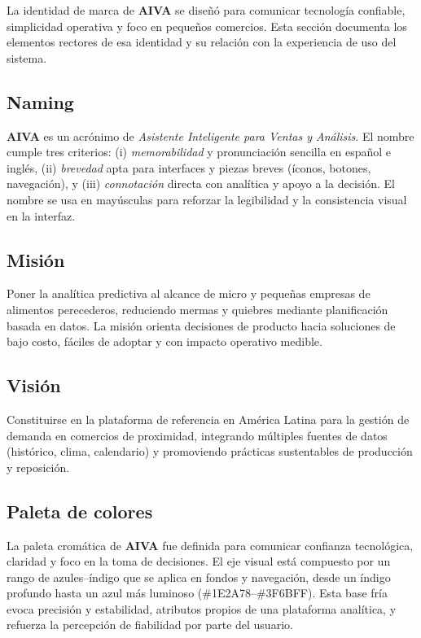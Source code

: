 La identidad de marca de \textbf{AIVA} se diseñó para comunicar tecnología confiable, simplicidad operativa y foco en pequeños comercios. Esta sección documenta los elementos rectores de esa identidad y su relación con la experiencia de uso del sistema.

\subsection{Naming}
\textbf{AIVA} es un acrónimo de \textit{Asistente Inteligente para Ventas y Análisis}. El nombre cumple tres criterios: (i) \textit{memorabilidad} y pronunciación sencilla en español e inglés, (ii) \textit{brevedad} apta para interfaces y piezas breves (íconos, botones, navegación), y (iii) \textit{connotación} directa con analítica y apoyo a la decisión. El nombre se usa en mayúsculas para reforzar la legibilidad y la consistencia visual en la interfaz.

\subsection{Misión}
Poner la analítica predictiva al alcance de micro y pequeñas empresas de alimentos perecederos, reduciendo mermas y quiebres mediante planificación basada en datos. La misión orienta decisiones de producto hacia soluciones de bajo costo, fáciles de adoptar y con impacto operativo medible.

\subsection{Visión}
Constituirse en la plataforma de referencia en América Latina para la gestión de demanda en comercios de proximidad, integrando múltiples fuentes de datos (histórico, clima, calendario) y promoviendo prácticas sustentables de producción y reposición.

\subsection{Paleta de colores}\label{subsec:paleta}

La paleta cromática de \textbf{AIVA} fue definida para comunicar confianza tecnológica, claridad y foco en la toma de decisiones. El eje visual está compuesto por un rango de azules–índigo que se aplica en fondos y navegación, desde un índigo profundo hasta un azul más luminoso (\#1E2A78–\#3F6BFF). Esta base fría evoca precisión y estabilidad, atributos propios de una plataforma analítica, y refuerza la percepción de fiabilidad por parte del usuario.

